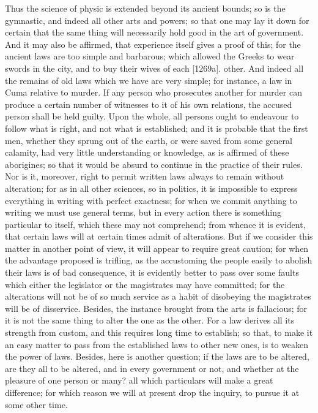 Thus the science of physic is extended beyond its ancient bounds; so is
the gymnastic, and indeed all other arts and powers; so that one may lay
it down for certain that the same thing will necessarily hold good in the
art of government. And it may also be affirmed, that experience itself
gives a proof of this; for the ancient laws are too simple and barbarous;
which allowed the Greeks to wear swords in the city, and to buy their
wives of each [1269a]. other. And indeed all the remains of old laws which
we have are very simple; for instance, a law in Cuma relative to murder.
If any person who prosecutes another for murder can produce a certain
number of witnesses to it of his own relations, the accused person shall
be held guilty. Upon the whole, all persons ought to endeavour to follow
what is right, and not what is established; and it is probable that the
first men, whether they sprung out of the earth, or were saved from some
general calamity, had very little understanding or knowledge, as is
affirmed of these aborigines; so that it would be absurd to continue in
the practice of their rules. Nor is it, moreover, right to permit written
laws always to remain without alteration; for as in all other sciences, so
in politics, it is impossible to express everything in writing with
perfect exactness; for when we commit anything to writing we must use
general terms, but in every action there is something particular to
itself, which these may not comprehend; from whence it is evident, that
certain laws will at certain times admit of alterations. But if we
consider this matter in another point of view, it will appear to require
great caution; for when the advantage proposed is trifling, as the
accustoming the people easily to abolish their laws is of bad consequence,
it is evidently better to pass over some faults which either the
legislator or the magistrates may have committed; for the alterations will
not be of so much service as a habit of disobeying the magistrates will be
of disservice. Besides, the instance brought from the arts is fallacious;
for it is not the same thing to alter the one as the other. For a law
derives all its strength from custom, and this requires long time to
establish; so that, to make it an easy matter to pass from the established
laws to other new ones, is to weaken the power of laws. Besides, here is
another question; if the laws are to be altered, are they all to be
altered, and in every government or not, and whether at the pleasure of
one person or many? all which particulars will make a great difference;
for which reason we will at present drop the inquiry, to pursue it at some
other time.

